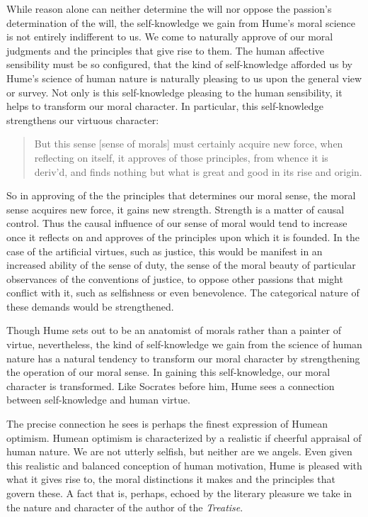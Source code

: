 While reason alone can neither determine the will nor oppose the passion's determination of the will, the self-knowledge we gain from Hume's moral science is not entirely indifferent to us. We come to naturally approve of our moral judgments and the principles that give rise to them. The human affective sensibility must be so configured, that the kind of self-knowledge afforded us by Hume's science of human nature is naturally pleasing to us upon the general view or survey. Not only is this self-knowledge pleasing to the human sensibility, it helps to transform our moral character. In particular, this self-knowledge strengthens our virtuous character:

\begin{quote}
	But this sense [sense of morals] must certainly acquire new force, when reflecting on itself, it approves of those principles, from whence it is deriv'd, and finds nothing but what is great and good in its rise and origin.
\end{quote}

So in approving of the the principles that determines our moral sense, the moral sense acquires new force, it gains new strength. Strength is a matter of causal control. Thus the causal influence of our sense of moral would tend to increase once it reflects on and approves of the principles upon which it is founded. In the case of the artificial virtues, such as justice, this would be manifest in an increased ability of the sense of duty, the sense of the moral beauty of particular observances of the conventions of justice, to oppose other passions that might conflict with it, such as selfishness or even benevolence. The categorical nature of these demands would be strengthened.

Though Hume sets out to be an anatomist of morals rather than a painter of virtue, nevertheless, the kind of self-knowledge we gain from the science of human nature has a natural tendency to transform our moral character by strengthening the operation of our moral sense. In gaining this self-knowledge, our moral character is transformed. Like Socrates before him, Hume sees a connection between self-knowledge and human virtue.

The precise connection he sees is perhaps the finest expression of Humean optimism. Humean optimism is characterized by a realistic if cheerful appraisal of human nature. We are not utterly selfish, but neither are we angels. Even given this realistic and balanced conception of human motivation, Hume is pleased with what it gives rise to, the moral distinctions it makes and the principles that govern these. A fact that is, perhaps, echoed by the literary pleasure we take in the nature and character of the author of the \emph{Treatise}.

